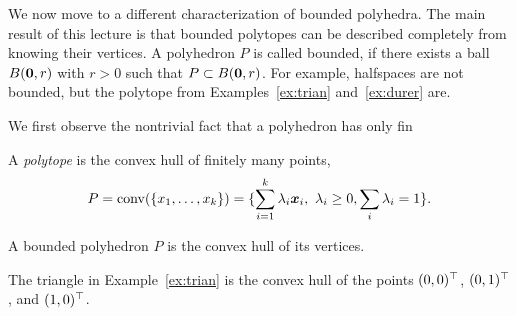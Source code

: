 We now move to a different characterization of bounded polyhedra. The main result of this lecture is that bounded polytopes can be described completely from knowing their vertices. A polyhedron $P$ is called bounded, if there exists a ball $B(\bm{0},r)$ with $r>0$ such that $P\subset B(\bm{0},r)$. For example, halfspaces are not bounded, but the polytope from Examples~\ref{ex:trian} and~\ref{ex:durer} are.

We first observe the nontrivial fact that a polyhedron has only fin

\begin{definition}
 A {\em polytope} is the convex hull of finitely many points,
 \begin{equation*}
  P = \operatorname{conv}(\{x_1,\dots,x_k\}) = \{\sum_{i=1}^k \lambda_i\bm{x}_i, \ \lambda_i\geq 0, \sum_i \lambda_i=1\}.
 \end{equation*}
\end{definition}

\begin{theorem}\label{thm:main1}
 A bounded polyhedron $P$ is the convex hull of its vertices.
\end{theorem}

\begin{example}
The triangle in Example~\ref{ex:trian} is the convex hull of the points $(0,0)^{\top}$, $(0,1)^{\top}$, and $(1,0)^{\top}$.
\end{example}

